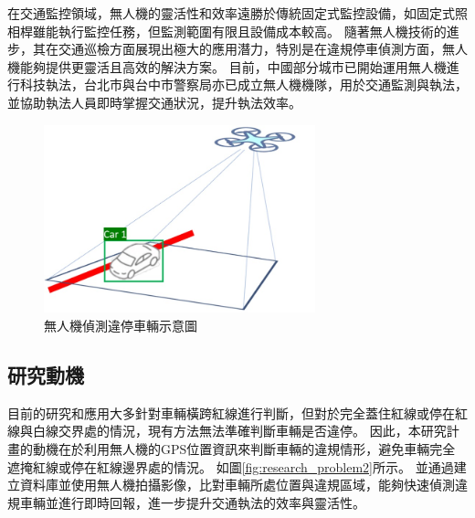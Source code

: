 \documentclass[12pt]{article}       %
\renewcommand{\figurename}{圖}                           %
\begin{document}
在交通監控領域，無人機的靈活性和效率遠勝於傳統固定式監控設備，如固定式照相桿雖能執行監控任務，但監測範圍有限且設備成本較高。
隨著無人機技術的進步，其在交通巡檢方面展現出極大的應用潛力，特別是在違規停車偵測方面，無人機能夠提供更靈活且高效的解決方案。
目前，中國部分城市已開始運用無人機進行科技執法\cite{chinatimes2019}，台北市與台中市警察局亦已成立無人機機隊\cite{cna_2022}\cite{tai_2021}，用於交通監測與執法，並協助執法人員即時掌握交通狀況，提升執法效率。

\begin{figure}[htbp]
    \centering
    \renewcommand{\figurename}{圖} %
    \includegraphics[width=0.7\textwidth]{research_problem1.jpg}     %
    \caption{無人機偵測違停車輛示意圖}    %
    \label{fig:research_problem1}    %
\end{figure}

\subsection{研究動機} 
\hspace{2em}目前的研究和應用大多針對車輛橫跨紅線進行判斷，但對於完全蓋住紅線或停在紅線與白線交界處的情況，現有方法無法準確判斷車輛是否違停。
因此，本研究計畫的動機在於利用無人機的GPS位置資訊來判斷車輛的違規情形，避免車輛完全遮掩紅線或停在紅線邊界處的情況。
如圖\ref{fig:research_problem2}所示。
並通過建立資料庫並使用無人機拍攝影像，比對車輛所處位置與違規區域，能夠快速偵測違規車輛並進行即時回報，進一步提升交通執法的效率與靈活性。
\end{document}
